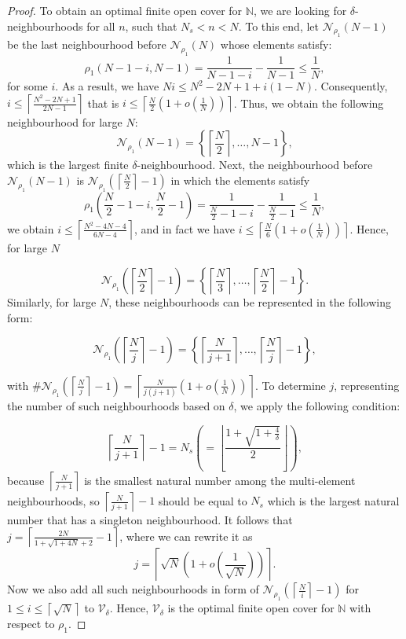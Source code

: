 \documentclass[11pt, reqno]{amsart}
\theoremstyle{plain}%
\theoremstyle{definition}
\theoremstyle{definition}
\def\N{\ensuremath{\mathbb N}}
\def\st{such that }
\numberwithin{equation}{section}
\begin{document}
\begin{proof}
To obtain an optimal finite open cover for $\N$, we are looking for $\delta$-neighbourhoods for all $n$, \st $N_s<n<N$. To this end, let $\mathcal{N}_{\rho_1}(N-1)$ be the last neighbourhood before $\mathcal{N}_{\rho_1}(N)$ whose elements satisfy: 
$${\rho_1}(N-1-i,N-1)=\frac{1}{N-1-i}-\frac{1}{N-1}\le \frac{1}{N},$$
for some $i$. As a result, we have $Ni\le N^2-2N+1+i(1-N).$ Consequently, $i\le\left\lceil\frac{N^2-2N+1}{2N-1}\right\rceil$ that is $i\le \left\lceil \frac{N}{2}\left(1+o\left(\frac{1}{N}\right)\right)\right\rceil$. Thus, we obtain the following neighbourhood for large $N$:
\begin{equation}\label{Def: Nei N-1}
\mathcal{N}_{\rho_1}(N-1) =\left\{ \left\lceil\frac{N}{2}\right\rceil,\ldots,N-1  \right\},\end{equation}
which is the largest finite $\delta$-neighbourhood. Next, the neighbourhood before $\mathcal{N}_{\rho_1}\left(N-1\right)$ is $\mathcal{N}_{\rho_1}\left(\left\lceil\frac{N}{2}\right\rceil-1\right)$ in which the elements satisfy
$${\rho_1}\left(\frac{N}{2}-1-i,\frac{N}{2}-1\right)=\frac{1}{\frac{N}{2}-1-i}-\frac{1}{\frac{N}{2}-1}\le\frac{1}{N},$$
we obtain $i\le\left\lceil\frac{N^2-4N-4}{6N-4}\right\rceil$, and in fact we have $i\le \left\lceil \frac{N}{6}\left(1+o\left(\frac{1}{N}\right)\right)\right\rceil$. Hence, for large $N$

$$\mathcal{N}_{\rho_1}\left(\left\lceil\frac{N}{2}\right\rceil-1\right)=\left\{ \left\lceil\frac{N}{3}\right\rceil,\ldots,\left\lceil\frac{N}{2}\right\rceil-1  \right\}.$$ 
Similarly, for large $N$, these neighbourhoods can be represented in the following form:

\begin{equation}\label{Def: Nei N-j}
\mathcal{N}_{\rho_1}\left(\left\lceil\frac{N}{j}\right\rceil-1\right)=\left\{ \left\lceil\frac{N}{j+1}\right\rceil,\ldots,\left\lceil\frac{N}{j}\right\rceil-1  \right\},\end{equation}

with $\#\mathcal{N}_{\rho_1}\left(\left\lceil\frac{N}{j}\right\rceil-1\right)=\left\lceil\frac{N}{j(j+1)}\left(1+o\left(\frac1{N}\right)\right)\right\rceil$.  To determine $j$, representing the number of such neighbourhoods based on $\delta$, we apply the following condition:

$$ \left\lceil\frac{N}{j+1}\right\rceil-1=N_s\left(=\left\lfloor\frac{1+ \sqrt{1+\frac{4}{\delta}}}{2}\right\rfloor\right),$$
because $\left\lceil\frac{N}{j+1}\right\rceil$ is the smallest natural number among the multi-element neighbourhoods, so $\left\lceil\frac{N}{j+1}\right\rceil-1$ should be equal to $N_s$ which is the largest natural number that has a singleton neighbourhood.
It follows that $j=\left\lceil\frac{2N}{1+\sqrt{1+4N}+2}-1\right\rceil$, where we can rewrite it as $$j=\left\lceil\sqrt{N}\left(1+o\left(\frac{1}{\sqrt{N}}\right)\right)\right\rceil.$$
Now we also add all such neighbourhoods in form of $\mathcal{N}_{\rho_1}\left(\left\lceil\frac{N}{i}\right\rceil-1\right)$ for $1\le i\le \left\lceil\sqrt{N}\right\rceil$ to $\mathcal{V}_\delta$. Hence, $\mathcal{V}_\delta$ is the optimal finite open cover for $\N$ with respect to ${\rho_1}$.



\end{proof}
\end{document}
